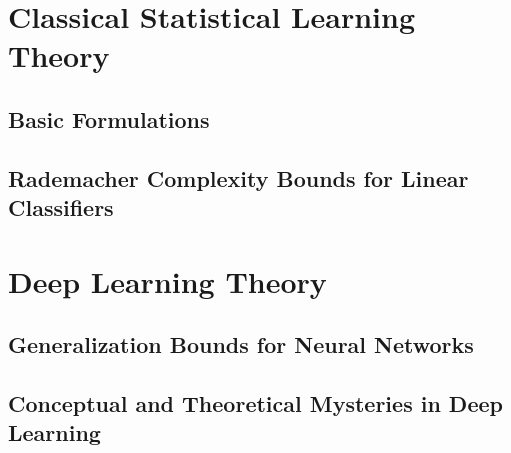 \documentclass[oneside, openany]{book}
\theoremstyle{definition}
\theoremstyle{remark}
\numberwithin{section}{chapter}
\numberwithin{equation}{chapter}
\begin{document}
	\part{Classical Statistical Learning Theory}\label{part:supervised}
	
	\chapter{Basic Formulations}\label{chap:supervised}
	
%	
%	
%
%	

%	
%	
% 
%	
	\chapter{Rademacher Complexity Bounds for Linear Classifiers}\label{chap:gen-bounds}
	
	
%	

\part{Deep Learning Theory}	

\chapter{Generalization Bounds for Neural Networks} \label{chap:gen-bounds-nns}


\chapter{Conceptual and Theoretical Mysteries in Deep Learning}\label{chap:dl-overview}

\end{document}
